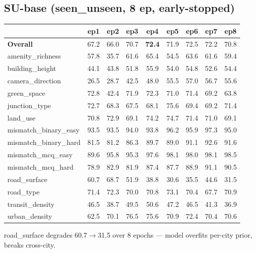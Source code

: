 \documentclass[11pt]{article}
\begin{document}
\subsection*{SU-base (seen\_unseen, 8 ep, early-stopped)}

\begin{table}[h]\centering\scriptsize
\setlength{\tabcolsep}{4pt}
\begin{tabular}{l c c c c c c c c}
\toprule
& ep1 & ep2 & ep3 & ep4 & ep5 & ep6 & ep7 & ep8 \\
\midrule
\textbf{Overall}      & 67.2 & 66.0 & 70.7 & \textbf{72.4} & 71.9 & 72.5 & 72.2 & 70.8 \\
amenity\_richness     & 57.8 & 35.7 & 61.6 & 65.4 & 54.5 & 63.6 & 61.6 & 59.4 \\
building\_height      & 44.1 & 43.8 & 51.8 & 55.9 & 54.0 & 54.8 & 52.6 & 54.4 \\
camera\_direction     & 26.5 & 28.7 & 42.5 & 48.0 & 55.5 & 57.0 & 56.7 & 55.6 \\
green\_space          & 72.8 & 42.4 & 71.9 & 72.3 & 71.0 & 71.4 & 69.2 & 63.8 \\
junction\_type        & 72.7 & 68.3 & 67.5 & 68.1 & 75.6 & 69.4 & 69.2 & 71.4 \\
land\_use             & 70.8 & 72.9 & 69.1 & 74.2 & 74.7 & 71.4 & 71.0 & 69.1 \\
mismatch\_binary\_easy& 93.5 & 93.5 & 94.0 & 93.8 & 96.2 & 95.9 & 97.3 & 95.0 \\
mismatch\_binary\_hard& 81.5 & 81.2 & 86.3 & 89.7 & 89.0 & 91.1 & 92.6 & 91.6 \\
mismatch\_mcq\_easy   & 89.6 & 95.8 & 95.3 & 97.6 & 98.1 & 98.0 & 98.1 & 98.5 \\
mismatch\_mcq\_hard   & 78.9 & 82.9 & 81.9 & 87.4 & 87.7 & 88.9 & 91.1 & 90.5 \\
road\_surface         & 60.7 & 68.7 & 51.9 & 38.8 & 30.6 & 35.5 & 44.6 & 31.5 \\
road\_type            & 71.4 & 72.3 & 70.0 & 70.8 & 73.1 & 70.4 & 67.7 & 70.9 \\
transit\_density      & 46.5 & 38.7 & 49.5 & 50.6 & 47.2 & 46.5 & 41.3 & 36.9 \\
urban\_density        & 62.5 & 70.1 & 76.5 & 75.6 & 70.9 & 72.4 & 70.4 & 70.6 \\
\bottomrule
\end{tabular}
\end{table}

road\_surface degrades 60.7$\to$31.5 over 8 epochs --- model overfits per-city prior, breaks cross-city.
\end{document}
